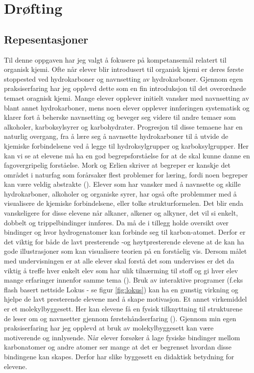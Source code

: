 \documentclass[main.tex]{subfiles}
\begin{document}
\section*{Drøfting}

\subsection*{Repesentasjoner}

Til denne oppgaven har jeg valgt å fokusere på kompetansemål relatert til organisk kjemi. Ofte når elever blir introdusert til organisk kjemi er deres første stoppested ved hydrokarboner og navnsetting av hydrokarboner. Gjennom egen praksiserfaring har jeg opplevd dette som en fin introduksjon til det overordnede temaet oragnisk kjemi. Mange elever opplever initielt vansker med navnsetting av blant annet hydrokarboner, mens noen elever opplever innføringen systematisk og klarer fort å beherske navnsetting og beveger seg videre til andre temaer som alkoholer, karboksylsyrer og karbohydrater. Progresjon til disse temaene har en naturlig overgang, fra å lære seg å navnsette hydrokarboner til å utvide de kjemiske forbindelsene ved å legge til hydroksylgrupper og karboksylgrupper. Her kan vi se at elevene må ha en god begrepsforståelse for at de skal kunne danne en fagovergripelig forståelse. Mork og Erlien skriver at begreper er kanskje det området i naturfag som forårsaker flest problemer for læring, fordi noen begreper kan være veldig abstrakte ().
\newline\newline
Elever som har vansker med å navnsette og skille hydrokarboner, alkoholer og organiske syrer, har også ofte problemmer med å visualisere de kjemiske forbindelsene, eller tolke strukturformelen. Det blir enda vanskeligere for disse elevene når alkaner, alkener og alkyner, det vil si enkelt, dobbelt og trippelbindinger innføres. Da må de i tillegg holde oversikt over bindinger og hvor hydrogenatomer kan forbinde seg til karbon-atomet. Derfor er det viktig for både de lavt presterende -og høytpresterende elevene at de kan ha gode illustrasjoner som kan visualisere teorien på en forståelig vis. Dersom målet med undervisningen er at alle elever skal forstå det som undervises er det da viktig å treffe  hver enkelt elev som har ulik tilnærming til stoff og gi hver elev mange erfaringer innenfor samme tema (). 
\newline\newline
Bruk av interaktive programer (f.eks flash basert nettside Lokus - se figur \ref{fig:lokus}) kan ha en gunstig virkning og hjelpe de lavt presterende elevene med å skape motivasjon. Et annet virkemiddel er et molekylbyggesett. Her kan elevene få en fysisk tilknyttning til strukturene de leser om og navnsetter gjennom førstehåndserfaring (). Gjennom min egen praksiserfaring har jeg opplevd at bruk av molekylbyggesett kan være motiverende og innlysende. Når elever forsøker å lage fysiske bindinger mellom karbonatomer og andre atomer ser mange at det er begrenset hvordan disse bindingene kan skapes. Derfor har slike byggesett en didaktisk betydning for elevene.\newline
\end{document}
